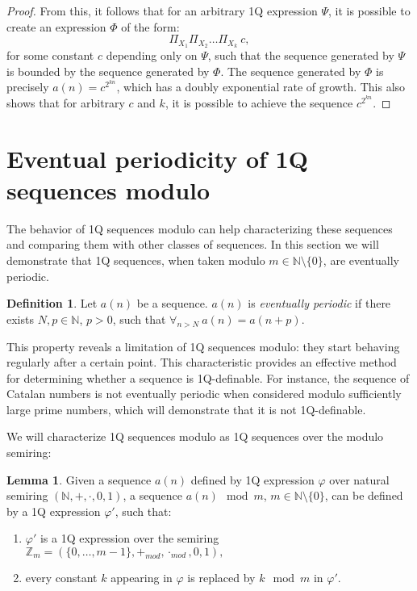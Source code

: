 \documentclass[12pt]{article}
\theoremstyle{definition}
\newtheorem{definition}{Definition}[section]
\newtheorem{lemma}[theorem]{Lemma}
\begin{document}
\begin{proof}
    From this, it follows that for an arbitrary 1Q expression $\varPsi$, it is possible to create an expression $\varPhi$ of the form:
    $$\Pi_{X_1}\Pi_{X_2}\ldots \Pi_{X_k} \ c,$$
    for some constant $c$ depending only on $\varPsi$, such that the sequence generated by $\varPsi$ is bounded by the sequence generated by $\varPhi$. The sequence generated by $\varPhi$ is precisely $a(n) = c^{2^{kn}}$, which has a doubly exponential rate of growth. This also shows that for arbitrary $c$ and $k$, it is possible to achieve the sequence $c^{2^{kn}}$.
\end{proof}

\section{Eventual periodicity of 1Q sequences modulo}
\label{Sec1QFiniteSemirings}
The behavior of 1Q sequences modulo can help characterizing these sequences and comparing them with other classes of sequences. In this section we will demonstrate that 1Q sequences, when taken modulo $m \in \mathbb{N} \setminus \{0\}$, are eventually periodic.

\begin{definition}
    Let $a(n)$ be a sequence. $a(n)$ is \textit{eventually periodic} if there exists $N, p \in \mathbb{N}$, $p > 0$, such that $\forall_{n > N} \ a(n) = a(n+p)$.
\end{definition}

This property reveals a limitation of 1Q sequences modulo: they start behaving regularly after a certain point. This characteristic provides an effective method for determining whether a sequence is 1Q-definable. For instance, the sequence of Catalan numbers is not eventually periodic when considered modulo sufficiently large prime numbers, which will demonstrate that it is not 1Q-definable.

We will characterize 1Q sequences modulo as 1Q sequences over the modulo semiring:

\begin{lemma}
    \label{1QModulo}
    Given a sequence $a(n)$ defined by 1Q expression $\varphi$ over natural semiring $(\mathbb{N}, +, \cdot, 0, 1)$, a sequence $a(n) \mod m$, $m \in \mathbb{N} \setminus \{0\}$, can be defined by a 1Q expression $\varphi'$, such that:
    \begin{enumerate}
        \item $\varphi'$ is a 1Q expression over the semiring $\mathbb{Z}_m = (\{0,\ldots,m-1\}, +_{mod}, \cdot_{mod}, 0, 1),$
        \item every constant $k$ appearing in $\varphi$ is replaced by $k \mod m$ in $\varphi'.$
    \end{enumerate}
\end{lemma}
\end{document}
